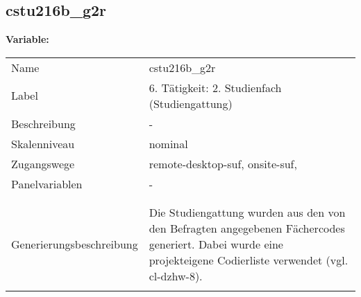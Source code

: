 	
	
	\subsection{cstu216b\_g2r}
	\label{subSection:cstu216b_g2r}

	\noindent\textbf{Variable:}\\
		\begin{tabular}{lL{11.3cm}}
			\label{tableVariable:cstu216b_g2r}
			Name & cstu216b\_g2r \\
			Label & 6. Tätigkeit: 2. Studienfach (Studiengattung) \\
			Beschreibung & - \\
			Skalenniveau & nominal \\
			Zugangswege &
				remote-desktop-suf,
				onsite-suf,
 \\
			Panelvariablen & -
			 \\
			 \\
 \\
					Generierungsbeschreibung & Die Studiengattung wurden aus den von den Befragten angegebenen Fächercodes generiert.  Dabei wurde eine projekteigene Codierliste verwendet (vgl. cl-dzhw-8).
				 \\	
			 \\
		\end{tabular}






